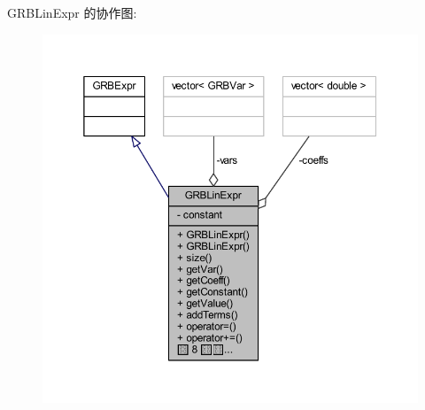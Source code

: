 G\+R\+B\+Lin\+Expr 的协作图\+:
\nopagebreak
\begin{figure}[H]
\begin{center}
\leavevmode
\includegraphics[width=350pt]{classGRBLinExpr__coll__graph}
\end{center}
\end{figure}
